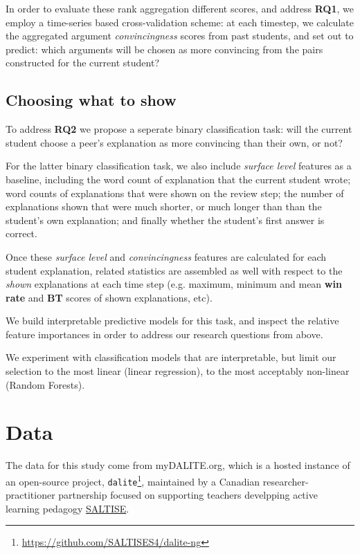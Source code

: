 \documentclass[sigconf]{acmart}
\begin{document}
In order to evaluate these rank aggregation different scores, and address 
\textbf{RQ1}, we employ a time-series based cross-validation scheme:
at each timestep, we calculate the aggregated argument \textit{convincingness} 
scores from past students, and set out to predict: which arguments will be 
chosen as more convincing from the pairs constructed for the current student?  

\subsection{Choosing what to show}
To address \textbf{RQ2} we propose a seperate binary classification task: will 
the current student choose a peer's explanation as more convincing than their 
own, or not?

For the latter binary classification task, we also include \textit{surface 
level} features as a baseline, including the word count of explanation that the 
current student wrote; word counts of explanations that were shown on the 
review step; the number of explanations shown that were much shorter, or much 
longer than than the student's own explanation; and finally whether the 
student's first answer is correct.

Once these \textit{surface level} and \textit{convincingness} features are 
calculated for each student explanation, related statistics are assembled as 
well with respect to the \textit{shown} explanations at each time step (e.g. 
maximum, minimum and mean \textbf{win rate} and \textbf{BT} scores of shown 
explanations, etc).

We build interpretable predictive models for this task, and inspect the 
relative feature importances in order to address our research questions from 
above.

We experiment with classification models that are interpretable, but limit our 
selection to the most linear (linear regression), to the most acceptably 
non-linear (Random Forests).





\section{Data}

The data for this study come from myDALITE.org, which is a hosted instance of 
an open-source project, 
\verb|dalite|\footnote{\url{https://github.com/SALTISES4/dalite-ng}}, 
maintained by a Canadian researcher-practitioner partnership focused on 
supporting teachers develpping active learning pedagogy 
\href{saltise.ca}{SALTISE}.
\end{document}

